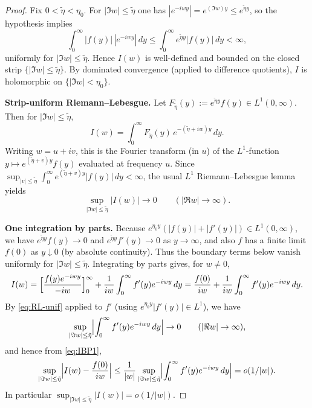 \documentclass[11pt]{amsart}
\theoremstyle{definition}
\theoremstyle{remark}
\begin{document}
\begin{proof}
Fix $0<\tilde\eta<\eta_0$. For $|\Im w|\le \tilde\eta$ one has
$|e^{-iwy}|=e^{(\Im w)y}\le e^{\tilde\eta y}$, so the hypothesis implies
\[
\int_0^\infty |f(y)|\,|e^{-iwy}|\,dy \le \int_0^\infty e^{\tilde\eta y}|f(y)|\,dy <\infty,
\]
uniformly for $|\Im w|\le\tilde\eta$. Hence $I(w)$ is well-defined and bounded on the closed strip
$\{|\Im w|\le\tilde\eta\}$. By dominated convergence (applied to difference quotients), $I$ is holomorphic
on $\{|\Im w|<\eta_0\}$.

\smallskip
\noindent\textbf{Strip-uniform Riemann--Lebesgue.}
Let $F_{\tilde\eta}(y):=e^{\tilde\eta y}f(y)\in L^1(0,\infty)$. Then for $|\Im w|\le\tilde\eta$,
\[
I(w)=\int_0^\infty F_{\tilde\eta}(y)\,e^{-(\tilde\eta+i w)y}\,dy.
\]
Writing $w=u+iv$, this is the Fourier transform (in $u$) of the $L^1$-function
$y\mapsto e^{(\tilde\eta+v)y}f(y)$ evaluated at frequency $u$. Since
$\sup_{|v|\le\tilde\eta}\int_0^\infty e^{(\tilde\eta+v)y}|f(y)|\,dy<\infty$,
the usual $L^1$ Riemann--Lebesgue lemma yields
\begin{equation}\label{eq:RL-unif}
\sup_{|\Im w|\le\tilde\eta}|I(w)|\longrightarrow 0
\qquad (|\Re w|\to\infty).
\end{equation}

\smallskip
\noindent\textbf{One integration by parts.}
Because $e^{\eta_0 y}(|f(y)|+|f'(y)|)\in L^1(0,\infty)$, we have $e^{\tilde\eta y}f(y)\to0$ and
$e^{\tilde\eta y}f'(y)\to0$ as $y\to\infty$, and also $f$ has a finite limit $f(0)$ as $y\downarrow0$
(by absolute continuity). Thus the boundary terms below vanish uniformly for $|\Im w|\le\tilde\eta$.
Integrating by parts gives, for $w\neq 0$,
\begin{equation}\label{eq:IBP1}
I(w)
=
\Bigl[\frac{f(y)e^{-iwy}}{-iw}\Bigr]_{0}^{\infty}
+\frac{1}{iw}\int_0^\infty f'(y)e^{-iwy}\,dy
=
\frac{f(0)}{iw}+\frac{1}{iw}\int_0^\infty f'(y)e^{-iwy}\,dy.
\end{equation}
By \eqref{eq:RL-unif} applied to $f'$ (using $e^{\eta_0 y}|f'(y)|\in L^1$), we have
\[
\sup_{|\Im w|\le\tilde\eta}\Bigl|\int_0^\infty f'(y)e^{-iwy}\,dy\Bigr|\to 0
\qquad (|\Re w|\to\infty),
\]
and hence from \eqref{eq:IBP1},
\[
\sup_{|\Im w|\le\tilde\eta}\Bigl|I(w)-\frac{f(0)}{iw}\Bigr|
\le
\frac{1}{|w|}\sup_{|\Im w|\le\tilde\eta}\Bigl|\int_0^\infty f'(y)e^{-iwy}\,dy\Bigr|
=
o(1/|w|).
\]
In particular $\sup_{|\Im w|\le\tilde\eta}|I(w)|=o(1/|w|)$.


\end{proof}
\end{document}
